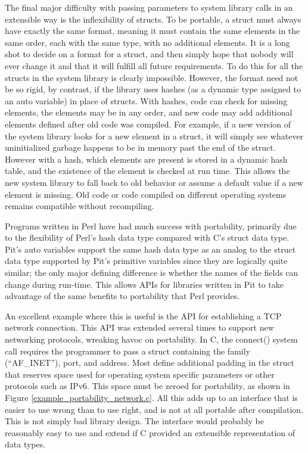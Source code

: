 The final major difficulty with passing parameters to system library calls in an extensible way is the inflexibility of
structs.  To be portable, a struct must always have exactly the same format, meaning it must contain the same elements
in the same order, each with the same type, with no additional elements.  It is a long shot to decide on a format for a
struct, and then simply hope that nobody will ever change it and that it will fulfill all future requirements.  To do this
for all the structs in the system library is clearly impossible.  However, the format need not be so rigid, by
contrast, if the library uses hashes (as a dynamic type assigned to an auto variable) in place of structs.  With hashes, code can check
for missing elements, the elements may be in any order, and new code may add additional elements defined after old code
was compiled.  For example, if a new version of the system library looks for a new element in a struct, it will simply
see whatever uninitialized garbage happens to be in memory past the end of the struct.  However with a hash, which
elements are present is stored in a dynamic hash table, and the existence of the element is checked at run time.  This allows
the new system library to fall back to old behavior or assume a default value if a new element is missing.  Old code or
code compiled on different operating systems remains compatible without recompiling.

Programs written in Perl have had much success with portability, primarily due to the flexibility of Perl's hash data
type compared with C's struct data type.  Pit's auto variables support the same hash data type as an analog to the
struct data type supported by Pit's primitive variables since they are logically quite similar; the only major defining
difference is whether the names of the fields can change during run-time.  This allows APIs for libraries written in
Pit to take advantage of the same benefits to portability that Perl provides.

An excellent example where this is useful is the API for establishing a TCP network connection.  This API was extended
several times to support new networking protocols, wreaking havoc on portability.  In C, the connect()
system call requires the programmer to pass a struct containing the family (``AF\_INET''), port, and address.  Most
define additional padding in the struct that reserves space used for operating system specific parameters or other
protocols such as IPv6.  This space must be zeroed for portability, as shown in Figure
\ref{example_portability_network.c}.  All this adds up to an interface that is easier to use wrong than to use right,
and is not at all portable after compilation.  This is not simply bad library design.  The interface would probably be
reasonably easy to use and extend if C provided an extensible representation of data types.

